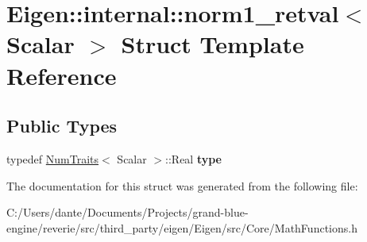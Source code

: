 \hypertarget{struct_eigen_1_1internal_1_1norm1__retval}{}\section{Eigen\+::internal\+::norm1\+\_\+retval$<$ Scalar $>$ Struct Template Reference}
\label{struct_eigen_1_1internal_1_1norm1__retval}
\subsection*{Public Types}
\begin{DoxyCompactItemize}
\item 
\mbox{\label{struct_eigen_1_1internal_1_1norm1__retval_a8d5cafa5b6a63e2afffe82632712627c}} 
typedef \mbox{\hyperlink{struct_eigen_1_1_num_traits}{Num\+Traits}}$<$ Scalar $>$\+::Real {\bfseries type}
\end{DoxyCompactItemize}


The documentation for this struct was generated from the following file\+:\begin{DoxyCompactItemize}
\item 
C\+:/\+Users/dante/\+Documents/\+Projects/grand-\/blue-\/engine/reverie/src/third\+\_\+party/eigen/\+Eigen/src/\+Core/Math\+Functions.\+h\end{DoxyCompactItemize}
